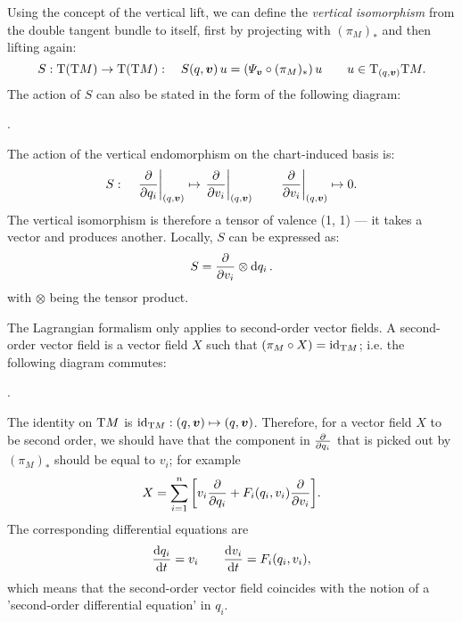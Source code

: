 Using the concept of the vertical lift, we can define the \emph{vertical isomorphism} from the double tangent bundle to itself, first by projecting with $(\pi_M)_*$ and then lifting again:
$$ S: \tbundle{\qty(\tbundle{M})} \to \tbundle{\qty(\tbundle{M})}: \quad S(q, \vec{v})\,u = \qty(\Psi_{\vec{v}} \circ (\pi_M)_*)\,u \qquad u \in \tspace{(q, \vec{v})}{\tbundle{M}}.  $$
The action of $S$ can also be stated in the form of the following diagram:
\begin{center}
   .
\end{center}
The action of the vertical endomorphism on the chart-induced basis is:
$$ S: \quad \left. \pdv{}{q_i}\right|_{(q, \vec{v})} \mapsto \left.\pdv{}{v_i}\right|_{(q, \vec{v})} \qquad  \left. \pdv{}{v_i}\right|_{(q, \vec{v})} \mapsto 0. $$
The vertical isomorphism is therefore a tensor of valence (1, 1) --- it takes a vector and produces another. Locally, $S$ can be expressed as:
$$ S = \pdv{}{v_i}\otimes \dd{q_i}. $$
with $\otimes$ being the tensor product. \cite{Carinena1990}

The Lagrangian formalism only applies to second-order vector fields. A second-order vector field is a vector field $X$ such that $(\pi_M \circ X) = \mathrm{id}_{\mathrm{T}M}$; i.e. the following diagram commutes: \cite{Abraham1978}
\begin{center}
   .
\end{center}
The identity on $\mathrm{T}M$ is $\mathrm{id}_{\tbundle{M}}: (q, \vec{v}) \mapsto (q, \vec{v})$. Therefore, for a vector field $X$ to be second order, we should have that the component in $\pdv{}{q_i}$ that is picked out by $(\pi_M)_*$ should be equal to $v_i$; for example
$$ X = \sum_{i=1}^n \qty[v_i \pdv{q_i} + F_i(q_i, v_i)\pdv{v_i}]. $$
The corresponding differential equations are
$$ \dv{q_i}{t} = v_i \qquad \dv{v_i}{t} = F_i(q_i, v_i), $$
which means that the second-order vector field coincides with the notion of a 'second-order differential equation' in $q_i$.

